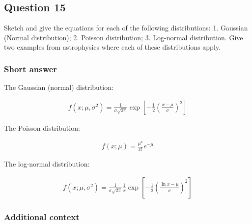 \documentclass[a4paper,10pt]{article}
\begin{document}

\newpage
\subsection{Question 15}

Sketch and give the equations for each of the following distributions: 1. Gaussian (Normal distribution); 2. Poisson distribution; 3. Log-normal distribution. Give two examples from astrophysics where each of these distributions apply.

\subsubsection{Short answer}

The Gaussian (normal) distribution:

\begin{align*}
    f(x;\mu,\sigma^2) = \frac{1}{\sigma\sqrt{2\pi}} \exp \left[-\frac{1}{2}\left(\frac{x-\mu}{\sigma}\right)^2\right]
\end{align*}

{\noindent}The Poisson distribution:

\begin{align*}
    f(x;\mu) = \frac{\mu^x}{x!} e^{-\mu}
\end{align*}

{\noindent}The log-normal distribution:

\begin{align*}
    f(x;\mu,\sigma^2) = \frac{1}{\sigma\sqrt{2\pi}} \frac{1}{x} \exp \left[-\frac{1}{2}\left(\frac{\ln x-\mu}{\sigma}\right)^2\right]
\end{align*}

\subsubsection{Additional context}
\end{document}
